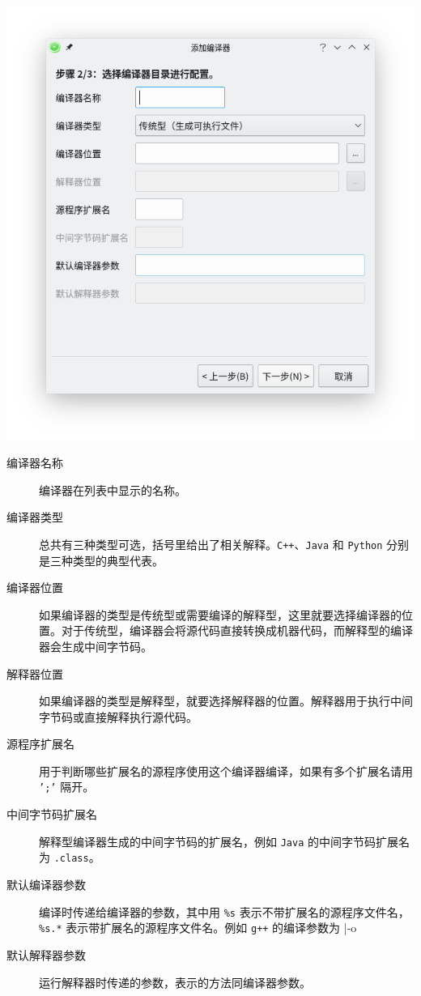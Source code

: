 \documentclass[UTF-8]{ctexart}
\begin{document}
				\begin{center}
					\includegraphics[scale=0.7]{pics/addcompiler2.png}
				\end{center}

				\begin{description}
					\item[编译器名称] 编译器在列表中显示的名称。
					\item[编译器类型] 总共有三种类型可选，括号里给出了相关解释。\texttt{C++}、\texttt{Java} 和 \texttt{Python} 分别是三种类型的典型代表。
					\item[编译器位置] 如果编译器的类型是传统型或需要编译的解释型，这里就要选择编译器的位置。对于传统型，编译器会将源代码直接转换成机器代码，而解释型的编译器会生成中间字节码。
					\item[解释器位置] 如果编译器的类型是解释型，就要选择解释器的位置。解释器用于执行中间字节码或直接解释执行源代码。
					\item[源程序扩展名] 用于判断哪些扩展名的源程序使用这个编译器编译，如果有多个扩展名请用 \texttt{';'} 隔开。
					\item[中间字节码扩展名] 解释型编译器生成的中间字节码的扩展名，例如 \texttt{Java} 的中间字节码扩展名为 \texttt{.class}。
					\item[默认编译器参数] 编译时传递给编译器的参数，其中用 \texttt{\%s} 表示不带扩展名的源程序文件名，\texttt{\%s.*} 表示带扩展名的源程序文件名。例如 \texttt{g++} 的编译参数为
						|-o %
					\item[默认解释器参数] 运行解释器时传递的参数，表示的方法同编译器参数。
				\end{description}
\end{document}
